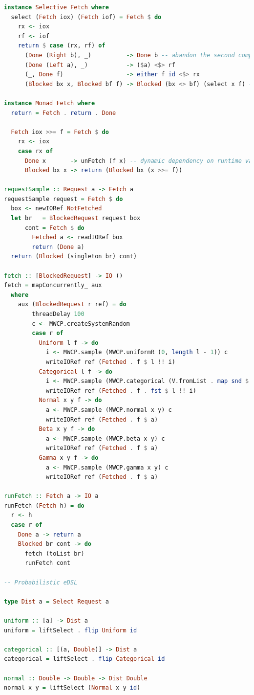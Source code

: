 \documentclass[
  oneside,
  11pt, a4paper,
  footinclude=true,
  headinclude=true,
  cleardoublepage=empty
]{scrbook}
\theoremstyle{definition}
\theoremstyle{definition}
\begin{document}
\begin{lstlisting}[language=Haskell, caption={SelectiveProb.hs},captionpos=b]
instance Selective Fetch where
  select (Fetch iox) (Fetch iof) = Fetch $ do
    rx <- iox
    rf <- iof
    return $ case (rx, rf) of
      (Done (Right b), _)          -> Done b -- abandon the second computation
      (Done (Left a), _)           -> ($a) <$> rf
      (_, Done f)                  -> either f id <$> rx
      (Blocked bx x, Blocked bf f) -> Blocked (bx <> bf) (select x f) -- speculative execution

instance Monad Fetch where
  return = Fetch . return . Done

  Fetch iox >>= f = Fetch $ do
    rx <- iox
    case rx of
      Done x       -> unFetch (f x) -- dynamic dependency on runtime value 'x'
      Blocked bx x -> return (Blocked bx (x >>= f))

requestSample :: Request a -> Fetch a
requestSample request = Fetch $ do
  box <- newIORef NotFetched
  let br   = BlockedRequest request box
      cont = Fetch $ do
        Fetched a <- readIORef box
        return (Done a)
  return (Blocked (singleton br) cont)

fetch :: [BlockedRequest] -> IO ()
fetch = mapConcurrently_ aux
  where
    aux (BlockedRequest r ref) = do
        threadDelay 100
        c <- MWCP.createSystemRandom
        case r of
          Uniform l f -> do
            i <- MWCP.sample (MWCP.uniformR (0, length l - 1)) c
            writeIORef ref (Fetched . f $ l !! i)
          Categorical l f -> do
            i <- MWCP.sample (MWCP.categorical (V.fromList . map snd $ l)) c
            writeIORef ref (Fetched . f . fst $ l !! i)
          Normal x y f -> do
            a <- MWCP.sample (MWCP.normal x y) c
            writeIORef ref (Fetched . f $ a)
          Beta x y f -> do
            a <- MWCP.sample (MWCP.beta x y) c
            writeIORef ref (Fetched . f $ a)
          Gamma x y f -> do
            a <- MWCP.sample (MWCP.gamma x y) c
            writeIORef ref (Fetched . f $ a)

runFetch :: Fetch a -> IO a
runFetch (Fetch h) = do
  r <- h
  case r of
    Done a -> return a
    Blocked br cont -> do
      fetch (toList br)
      runFetch cont

-- Probabilistic eDSL

type Dist a = Select Request a

uniform :: [a] -> Dist a
uniform = liftSelect . flip Uniform id

categorical :: [(a, Double)] -> Dist a
categorical = liftSelect . flip Categorical id

normal :: Double -> Double -> Dist Double
normal x y = liftSelect (Normal x y id)


\end{lstlisting}
\end{document}

